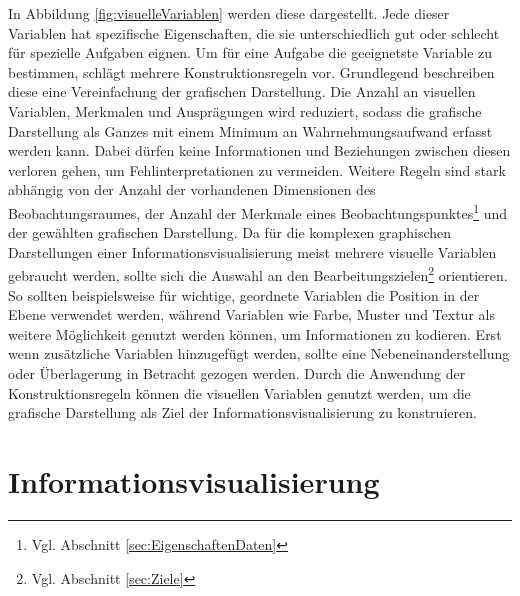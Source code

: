 \documentclass[a4paper, 12pt, DIVcalc, onepage, pdftex, headsepline, footsepline]{scrreprt}
\begin{document}
In Abbildung \ref{fig:visuelleVariablen} werden diese dargestellt.
Jede dieser Variablen hat spezifische Eigenschaften, die sie unterschiedlich gut oder schlecht
für spezielle Aufgaben eignen. Um für eine Aufgabe die geeignetste Variable zu bestimmen, schlägt
\citep{Bertin} mehrere Konstruktionsregeln vor.
Grundlegend beschreiben diese eine Vereinfachung der grafischen Darstellung.
Die Anzahl an visuellen Variablen, Merkmalen und Ausprägungen wird reduziert,
sodass die grafische Darstellung als Ganzes mit einem Minimum an Wahrnehmungsaufwand erfasst werden kann.
Dabei dürfen keine Informationen und Beziehungen zwischen diesen verloren gehen, um Fehlinterpretationen
zu vermeiden. Weitere Regeln sind stark abhängig von der Anzahl
der vorhandenen Dimensionen des Beobachtungsraumes, der Anzahl der Merkmale eines
Beobachtungspunktes\footnote{Vgl. Abschnitt \ref{sec:EigenschaftenDaten}} und der gewählten
grafischen Darstellung. Da für die komplexen graphischen Darstellungen einer 
Informationsvisualisierung meist mehrere visuelle Variablen gebraucht werden, sollte sich die Auswahl
an den Bearbeitungszielen\footnote{Vgl. Abschnitt \ref{sec:Ziele}} orientieren.
So sollten beispielsweise für wichtige, geordnete Variablen die Position in der Ebene verwendet werden,
während Variablen wie Farbe, Muster und Textur als weitere Möglichkeit genutzt werden können, um Informationen zu kodieren.
Erst wenn zusätzliche Variablen hinzugefügt werden, sollte eine Nebeneinanderstellung oder
Überlagerung in Betracht gezogen werden.
Durch die Anwendung der Konstruktionsregeln können die visuellen Variablen genutzt werden, um
die grafische Darstellung als Ziel der Informationsvisualisierung zu konstruieren.

\chapter{Informationsvisualisierung}
\label{cha:Informationsvisualisierung}
\end{document}
